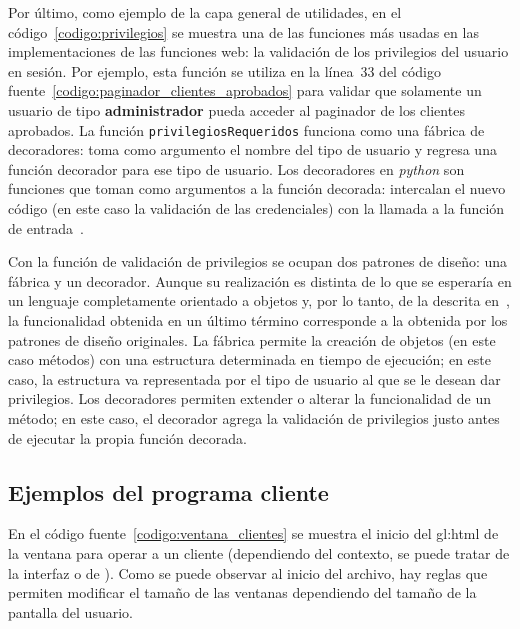 Por último, como ejemplo de la capa general de utilidades, en el
código~\ref{codigo:privilegios} se muestra una de las funciones más usadas en
las implementaciones de las funciones web: la validación de los privilegios del
usuario en sesión. Por ejemplo, esta función se utiliza en la línea~33 del
código fuente~\ref{codigo:paginador_clientes_aprobados} para validar que
solamente un usuario de tipo \textbf{administrador} pueda acceder al paginador
de los clientes aprobados. La función \texttt{privilegiosRequeridos} funciona
como una fábrica de decoradores: toma como argumento el nombre del tipo de
usuario y regresa una función decorador para ese tipo de usuario. Los
decoradores en \textit{python} son funciones que toman como argumentos a la
función decorada: intercalan el nuevo código (en este caso la validación de las
credenciales) con la llamada a la función de entrada~\cite{python_decoradores}.

Con la función de validación de privilegios se ocupan dos patrones de diseño:
una fábrica y un decorador. Aunque su realización es distinta de lo que se
esperaría en un lenguaje completamente orientado a objetos y, por lo tanto, de
la descrita en~\cite{patrones_de_disenio}, la funcionalidad obtenida en un
último término corresponde a la obtenida por los patrones de diseño originales.
La fábrica permite la creación de objetos (en este caso métodos) con una
estructura determinada en tiempo de ejecución; en este caso, la estructura va
representada por el tipo de usuario al que se le desean dar privilegios. Los
decoradores permiten extender o alterar la funcionalidad de un método; en este
caso, el decorador agrega la validación de privilegios justo antes de ejecutar
la propia función decorada.


\subsection{Ejemplos del programa cliente}

En el código fuente~\ref{codigo:ventana_clientes} se muestra el inicio del
\gls{gl:html} de la ventana para operar a un cliente (dependiendo del contexto,
se puede tratar de la interfaz  o de
). Como se puede observar al inicio del
archivo, hay reglas que permiten modificar el tamaño de las ventanas dependiendo
del tamaño de la pantalla del usuario.

